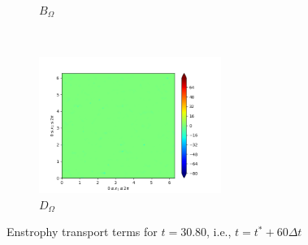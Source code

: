 \begin{figure}[H]
\begin{subfigure}{0.45\textwidth}
        \caption{$B_{\Omega}$}
    \end{subfigure}
    ~
    \begin{subfigure}{0.45\textwidth}
        \includegraphics[height=1.75in]{media/run-cds-65/D-enst-1400.png}
        \caption{$D_{\Omega}$}
    \end{subfigure}
    \caption{Enstrophy transport terms for $t=30.80$, i.e., $t=t^{\ast} + 60 \Delta t$}
\end{figure}

\newpage

